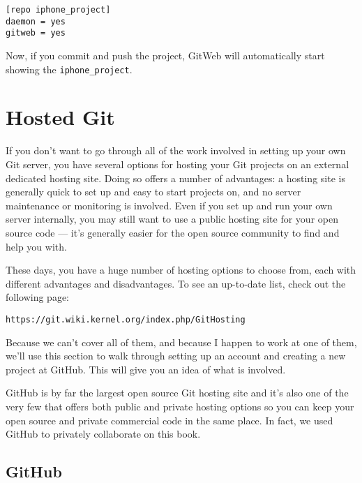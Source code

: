 \documentclass[a4paper]{book}
\begin{document}
\begin{shaded}\begin{verbatim}
[repo iphone_project]
daemon = yes
gitweb = yes
\end{verbatim}\end{shaded}

Now, if you commit and push the project, GitWeb will automatically start showing the \texttt{iphone\_project}.

\section{Hosted Git}\label{hosted-git}

If you don't want to go through all of the work involved in setting up your own Git server, you have several options for hosting your Git projects on an external dedicated hosting site. Doing so offers a number of advantages: a hosting site is generally quick to set up and easy to start projects on, and no server maintenance or monitoring is involved. Even if you set up and run your own server internally, you may still want to use a public hosting site for your open source code --- it's generally easier for the open source community to find and help you with.

These days, you have a huge number of hosting options to choose from, each with different advantages and disadvantages. To see an up-to-date list, check out the following page:

\begin{shaded}\begin{verbatim}
https://git.wiki.kernel.org/index.php/GitHosting
\end{verbatim}\end{shaded}

Because we can't cover all of them, and because I happen to work at one of them, we'll use this section to walk through setting up an account and creating a new project at GitHub. This will give you an idea of what is involved.

GitHub is by far the largest open source Git hosting site and it's also one of the very few that offers both public and private hosting options so you can keep your open source and private commercial code in the same place. In fact, we used GitHub to privately collaborate on this book.

\subsection{GitHub}\label{github}
\end{document}
